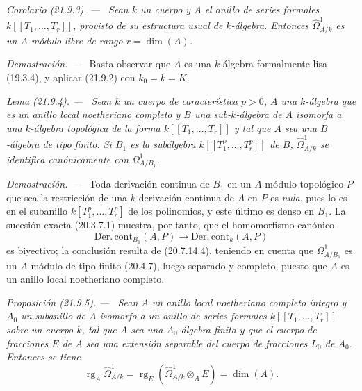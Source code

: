 \documentclass[10pt,oneside]{book}
\makeatletter
\newcommand{\setmanualcurrentlabel}[1]{\def\@currentlabel{#1}}
\newenvironment{proposition}[1][]{%
  \setmanualcurrentlabel{#1}\par\medskip\noindent\itshape Proposición (#1). ---\ }{\par}
\newenvironment{corollary}[1][]{%
  \setmanualcurrentlabel{#1}\par\medskip\noindent\itshape Corolario (#1). ---\ }{\par}
\newenvironment{lemma}[1][]{%
  \setmanualcurrentlabel{#1}\par\medskip\noindent\itshape Lema (#1). ---\ }{\par}
\newenvironment{proof}{%
  \par\medskip\noindent\textit{Demostración. ---\ }}{\par}
\makeatother
\begin{document}
\begin{corollary}[21.9.3]
\label{0.21.9.3-es}
Sean $k$ un cuerpo y $A$ el anillo de series formales
$k[[T_1,\ldots,T_r]]$, provisto de su estructura usual de $k$-álgebra.
Entonces $\widehat\Omega^1_{A/k}$ es un $A$-módulo libre de rango
$r=\dim(A)$.
\end{corollary}

\begin{proof}
Basta observar que $A$ es una $k$-álgebra formalmente lisa (19.3.4), y aplicar
(21.9.2) con $k_0=k=K$.
\end{proof}

\begin{lemma}[21.9.4]
\label{0.21.9.4-es}
Sean $k$ un cuerpo de característica $p>0$, $A$ una $k$-álgebra que es un
anillo local noetheriano completo y $B$ una sub-$k$-álgebra de $A$ isomorfa a
una $k$-álgebra topológica de la forma $k[[T_1,\ldots,T_r]]$ y tal que $A$ sea
una $B$-álgebra de tipo finito. Si $B_1$ es la subálgebra
$k[[T_1^p,\ldots,T_r^p]]$ de $B$, $\widehat\Omega^1_{A/k}$ se identifica
canónicamente con $\Omega^1_{A/B_1}$.
\end{lemma}

\begin{proof}
Toda derivación continua de $B_1$ en un $A$-módulo topológico $P$ que sea la
restricción de una $k$-derivación continua de $A$ en $P$ es \emph{nula}, pues
lo es en el subanillo $k[T_1^p,\ldots,T_r^p]$ de los polinomios, y este último
es denso en $B_1$. La sucesión exacta (20.3.7.1) muestra, por tanto, que el
homomorfismo canónico
\[
  \operatorname{D\acute{e}r.\,cont}_{B_1}(A,P)
  \longrightarrow \operatorname{D\acute{e}r.\,cont}_k(A,P)
\]
es biyectivo; la conclusión resulta de (20.7.14.4), teniendo en cuenta que
$\Omega^1_{A/B_1}$ es un $A$-módulo de tipo finito (20.4.7), luego separado y
completo, puesto que $A$ es un anillo local noetheriano completo.
\end{proof}

\begin{proposition}[21.9.5]
\label{0.21.9.5-es}
Sean $A$ un anillo local noetheriano completo íntegro y $A_0$ un subanillo de
$A$ isomorfo a un anillo de series formales $k[[T_1,\ldots,T_r]]$ sobre un
cuerpo $k$, tal que $A$ sea una $A_0$-álgebra \textup{finita} y que el cuerpo de
fracciones $E$ de $A$ sea una extensión \textup{separable} del cuerpo de fracciones
$L_0$ de $A_0$. Entonces se tiene
\begin{equation}
\tag{21.9.5.1}
\label{0.21.9.5.1-es}
  \operatorname{rg}_A\widehat\Omega^1_{A/k}
  =\operatorname{rg}_E(\widehat\Omega^1_{A/k}\otimes_AE)=\dim(A).
\end{equation}
\end{proposition}
\end{document}
